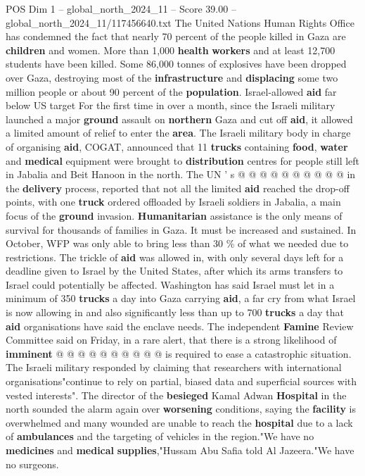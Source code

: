 \begin{textsample}{POS Dim 1 – global\_north\_2024\_11 – Score 39.00 – global\_north\_2024\_11/117456640.txt}
The United Nations Human Rights Office has condemned the fact that nearly 70 percent of the people killed in Gaza are \textbf{children} and women.
More than 1,000 \textbf{health} \textbf{workers} and at least 12,700 students have been killed.
Some 86,000 tonnes of explosives have been dropped over Gaza, destroying most of the \textbf{infrastructure} and \textbf{displacing} some two million people or about 90 percent of the \textbf{population}.
Israel-allowed \textbf{aid} far below US target For the first time in over a month, since the Israeli military launched a major \textbf{ground} assault on \textbf{northern} Gaza and cut off \textbf{aid}, it allowed a limited amount of relief to enter the \textbf{area}.
The Israeli military body in charge of organising \textbf{aid}, COGAT, announced that 11 \textbf{trucks} containing \textbf{food}, \textbf{water} and \textbf{medical} equipment were brought to \textbf{distribution} centres for people still left in Jabalia and Beit Hanoon in the north.
The UN ' s @ @ @ @ @ @ @ @ @ @ in the \textbf{delivery} process, reported that not all the limited \textbf{aid} reached the drop-off points, with one \textbf{truck} ordered offloaded by Israeli soldiers in Jabalia, a main focus of the \textbf{ground} invasion. \textbf{Humanitarian} assistance is the only means of survival for thousands of families in Gaza.
It must be increased and sustained.
In October, WFP was only able to bring less than 30 \% of what we needed due to restrictions.
The trickle of \textbf{aid} was allowed in, with only several days left for a deadline given to Israel by the United States, after which its arms transfers to Israel could potentially be affected.
Washington has said Israel must let in a minimum of 350 \textbf{trucks} a day into Gaza carrying \textbf{aid}, a far cry from what Israel is now allowing in and also significantly less than up to 700 \textbf{trucks} a day that \textbf{aid} organisations have said the enclave needs.
The independent \textbf{Famine} Review Committee said on Friday, in a rare alert, that there is a strong likelihood of \textbf{imminent} @ @ @ @ @ @ @ @ @ @ is required to ease a catastrophic situation.
The Israeli military responded by claiming that researchers with international organisations"continue to rely on partial, biased data and superficial sources with vested interests".
The director of the \textbf{besieged} Kamal Adwan \textbf{Hospital} in the north sounded the alarm again over \textbf{worsening} conditions, saying the \textbf{facility} is overwhelmed and many wounded are unable to reach the \textbf{hospital} due to a lack of \textbf{ambulances} and the targeting of vehicles in the region."We have no \textbf{medicines} and \textbf{medical} \textbf{supplies},"Hussam Abu Safia told Al Jazeera."We have no surgeons.

\end{textsample}
